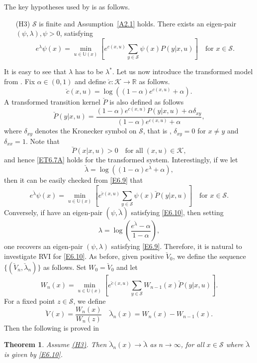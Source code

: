 \documentclass[notitlepage,11pt,reqno]{amsart}
\numberwithin{equation}{section}
\theoremstyle{plain}
\newtheorem{theorem}{Theorem}[section]
\theoremstyle{definition}
\theoremstyle{remark}
\newcommand{\Act}{{\mathds{U}}}
\newcommand{\sK}{{\mathscr{K}}}
\newcommand{\cS}{{\mathcal{S}}}     %
\newcommand{\RR}{\mathds{R}} %
\begin{document}
The key hypotheses used by \cite{MR2015911} is as follows.
\begin{itemize}
\item[\hypertarget{H3}{(H3)}] $\cS$ is finite and Assumption~\ref{A2.1} holds. There exists an eigen-pair $(\psi, \lambda), \psi>0$, satisfying
\begin{equation}\label{E6.9}
e^{\lambda}\psi(x) = \min_{u\in\Act(x)}\left[e^{ c(x,u)}\sum_{y\in\cS} \psi(x)P(y|x,u)\right]\quad\text{for}\,\, x\in \cS.
\end{equation}
\end{itemize}
It is easy to see that $\lambda$ has to be $\lambda^*$. Let us now introduce the transformed model from \cite{MR2015911}. Fix $\alpha\in (0, 1)$ and define
$\breve{c}:\sK\to\RR$ as follows.
$$\breve{c}(x, u)=\log ((1-\alpha) e^{c(x, u)} + \alpha).$$
A transformed transition kernel $\breve{P}$ is also defined as follows
$$\breve{P}(y|x, u)= \frac{(1-\alpha) e^{c(x, u)} P(y|x, u) + \alpha\delta_{xy}}{(1-\alpha) e^{c(x, u)} + \alpha},$$
where $\delta_{xy}$ denotes the Kronecker symbol on $\cS$, that is , $\delta_{xy}=0$ for $x\neq y$ and $\delta_{xx}=1$. Note that
$$\breve{P}(x|x, u)>0\quad \text{for all}\; (x, u)\in\sK,$$
and hence \eqref{ET6.7A} holds for the transformed system. Interestingly, if we let
$$\breve{\lambda}=\log((1-\alpha) e^\lambda + \alpha),$$
then it can be easily checked from \eqref{E6.9} that
\begin{equation}\label{E6.10}
e^{\breve\lambda}\psi(x) = \min_{u\in\Act(x)}\left[e^{\breve{c}(x,u)}\sum_{y\in\cS} \psi(x)\breve{P}(y|x,u)\right]\quad\text{for}\,\, x\in \cS.
\end{equation}
Conversely, if have an eigen-pair $(\psi, \breve\lambda)$ satisfying \eqref{E6.10}, then setting 
$$\lambda=\log\left(\frac{e^{\breve\lambda}-\alpha}{1-\alpha}\right),$$
one recovers an eigen-pair $(\psi, \lambda)$ satisfying \eqref{E6.9}. Therefore, it is natural to investigate RVI for \eqref{E6.10}.
As before, given positive $\breve{V}_0$, we define the sequence $\{(\breve{V}_n, \breve{\lambda}_n)\}$ as follows. Set $W_0=\breve{V}_0$ and let
$$W_n(x) = \min_{u\in\Act(x)}\left[e^{\breve{c}(x,u)}\sum_{y\in\cS} W_{n-1}(x)\breve{P}(y|x,u)\right].$$
For a fixed point $z\in\cS$, we define
$$\breve{V}(x)=\frac{W_n(x)}{W_n(z)}\quad \breve\lambda_n(x)=W_n(x)-W_{n-1}(x).$$
Then the following is proved in \cite[Theorem~4.1]{MR2015911}
\begin{theorem}
Assume \hyperlink{H3}{(H3)}. Then $\breve\lambda_n(x)\to\breve{\lambda}$ as $n\to\infty$, for all $x\in\cS$ where $\breve\lambda$ is given 
by \eqref{E6.10}.
\end{theorem}
\end{document}
